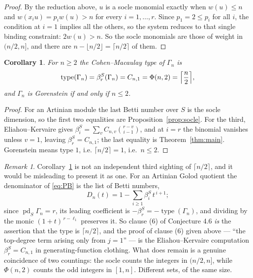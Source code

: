 \documentclass[a4paper,11pt,oneside,reqno]{amsart}
\theoremstyle{definition}
\theoremstyle{remark}
\newtheorem{remark}[definition]{Remark}
\theoremstyle{plain}
\newtheorem{corollary}[definition]{Corollary}
\newcommand{\Gam}{\Gamma}
\begin{document}
\begin{proof}
  By the reduction above, \(u\) is a socle monomial exactly when \(w(u) \le n\)
  and \(w(x_iu) = p_iw(u) > n\) for every \(i = 1,\dots,r\). Since \(p_1 = 2 \le p_i\)
  for all \(i\), the condition at \(i = 1\) implies all the others, so the system
  reduces to that single binding constraint: \(2w(u) > n\). So the socle monomials are those of weight
  in \((n/2,n]\), and there are \(n-\lfloor n/2\rfloor = \lceil n/2\rceil\)
  of them.
\end{proof}

\begin{corollary}\label{cor:type}
  For \(n \ge 2\) the Cohen--Macaulay type of \(\Gam_n\) is
  \begin{equation}\label{eq:type}
    \operatorname{type}(\Gam_n) = \beta^{S}_{r}(\Gam_n)
      =C_{n,1} = \Phi(n,2) = \Bigl\lceil\frac{n}{2}\Bigr\rceil,
  \end{equation}
  and \(\Gam_n\) is Gorenstein if and only if \(n \le 2\).
\end{corollary}

\begin{proof}
  For an Artinian module the last Betti number over \(S\) is the socle
  dimension, so the first two equalities are Proposition~\ref{prop:socle}. For
  the third, Eliahou--Kervaire gives
  \(\beta^{S}_{i} = \sum_{v}C_{n,v}\binom{r-v}{i-1}\), and at \(i = r\) the
  binomial vanishes unless \(v = 1\), leaving \(\beta^{S}_{r} = C_{n,1}\); the last
  equality is Theorem~\ref{thm:main}. Gorenstein means type \(1\), i.e.
  \(\lceil n/2\rceil = 1\), i.e.\ \(n \le 2\).
\end{proof}

\begin{remark}
  Corollary~\ref{cor:type} is not an independent third sighting of
  \(\lceil n/2\rceil\), and it would be misleading to present it as one.
  For an Artinian Golod quotient the denominator of \eqref{eq:PB} is the list
  of Betti numbers,
  \[
    D_n(t) = 1-\sum_{i \ge 1}\beta^{S}_{i}\,t^{\,i+1};
  \]
  since \(\operatorname{pd}_S\Gam_n = r\), its leading coefficient is
  \(-\beta^{S}_{r} = -\operatorname{type}(\Gam_n)\), and dividing by the monic
  \((1+t)^{\,r-\ell_1}\) preserves it. So clause (6) of Conjecture 4.6
  \emph{is} the assertion that the type is \(\lceil n/2\rceil\), and the proof
  of clause (6) given above --- ``the top-degree term arising only from
  \(j = 1\)'' --- is the Eliahou--Kervaire computation \(\beta^{S}_{r} = C_{n,1}\)
  in generating-function clothing. What does remain is a genuine coincidence of
  two countings: the socle counts the integers in \((n/2,n]\), while
  \(\Phi(n,2)\) counts the odd integers in \([1,n]\). Different sets, of the
  same size.
\end{remark}
\end{document}
